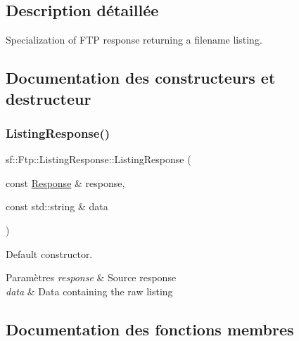 \subsection{Description détaillée}
Specialization of F\+TP response returning a filename listing. 

\subsection{Documentation des constructeurs et destructeur}
\mbox{\label{classsf_1_1Ftp_1_1ListingResponse_a7e98d0aed70105c71adb52e5b6ce0bb8}} 
\subsubsection{\texorpdfstring{Listing\+Response()}{ListingResponse()}}
{\footnotesize\ttfamily sf\+::\+Ftp\+::\+Listing\+Response\+::\+Listing\+Response (\begin{DoxyParamCaption}\item[{const \hyperlink{classsf_1_1Ftp_1_1Response}{Response} \&}]{response,  }\item[{const std\+::string \&}]{data }\end{DoxyParamCaption})}



Default constructor. 


\begin{DoxyParams}{Paramètres}
{\em response} & Source response \\
\hline
{\em data} & Data containing the raw listing \\
\hline
\end{DoxyParams}


\subsection{Documentation des fonctions membres}
\mbox{\label{classsf_1_1Ftp_1_1ListingResponse_a6cdcdfcc6a9008c7e1eddb48b164793d}} 
